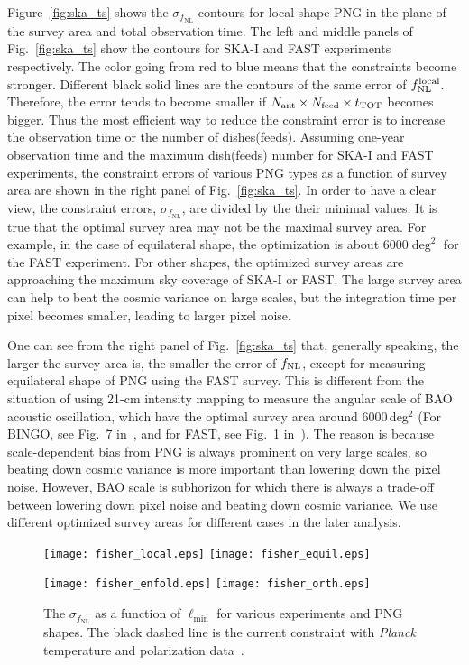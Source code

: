\documentclass[twocolumn,floatfix,nofootinbib,aps,reprint]{revtex4}
\begin{document}
Figure~\ref{fig:ska_ts} shows the $\sigma_{f_\mathrm{NL}}$ contours for 
local-shape PNG in the plane of the 
survey area and total observation time.
The left and middle panels of Fig.~\ref{fig:ska_ts} show the contours for SKA-I and FAST experiments respectively.
The color going from red to blue means that the constraints become stronger. Different black solid lines are the contours of the same error of $f^{\rm local}_{\rm NL}$. Therefore, the error tends to become smaller if $N_{\rm ant} \times N_{\rm feed} \times t_{\rm TOT}$ becomes bigger. Thus the most efficient way to reduce the constraint 
error is to increase the observation time or the number of dishes(feeds).
Assuming one-year observation time and the maximum dish(feeds) number
for SKA-I and FAST experiments, the constraint errors of
various PNG types as a function of survey area 
are shown in the right panel of Fig.~\ref{fig:ska_ts}.
In order to have a clear view, the constraint errors, $\sigma_{f_\mathrm{NL}}$,
are divided by the their minimal values.
It is true that the optimal survey area may not be the maximal survey
area. For example, 
in the case of equilateral shape, the optimization is 
about $6000\deg^2$ for the FAST experiment.
For other shapes, the optimized survey areas are approaching the maximum sky coverage of SKA-I or FAST.
The large survey area can help to beat the cosmic variance on
large scales, but the integration time per pixel becomes smaller, leading to larger pixel noise. 

One can see from the right panel of Fig.~\ref{fig:ska_ts} that, generally speaking, the larger the survey area is, the smaller the error of $f_{\rm NL}$, except for measuring equilateral shape of PNG using the FAST survey. This is different from the situation of using 21-cm intensity mapping to measure the angular scale of BAO acoustic oscillation, which have the optimal survey area around $6000\,$deg$^{2}$ (For BINGO, see Fig.~7 in~\cite{2013MNRAS.434.1239B}, and for FAST, see Fig.~1 in~\cite{Bigot16a}). The reason is because scale-dependent bias from PNG is always prominent on very large scales, so beating down cosmic variance is more important than lowering down the pixel noise. However, BAO scale is subhorizon for which there is always a trade-off between lowering down pixel noise and beating down cosmic variance. We use different optimized survey areas for different cases 
in the later analysis.

\begin{figure*}[htb]
    \centerline{
    \texttt{[image: fisher\_local.eps]}
    \texttt{[image: fisher\_equil.eps]}}
    \centerline{
    \texttt{[image: fisher\_enfold.eps]}
    \texttt{[image: fisher\_orth.eps]}}
    \vspace{-0.6cm}
    \caption{
        The $\sigma_{f_\mathrm{NL}}$ as a function of $\ell_\mathrm{min}$
        for various experiments and PNG shapes.
        The black dashed line is the current constraint with 
        {\it Planck} temperature and polarization data~\cite{2016A&A...594A..17P}.
    }\label{fig:fisher}
\end{figure*}
\end{document}
